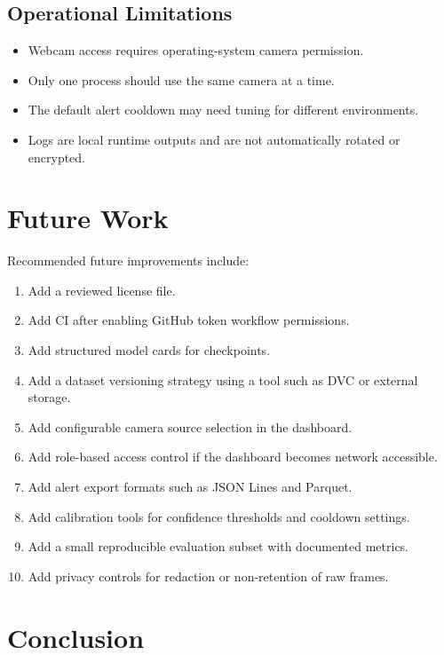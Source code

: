 \documentclass[12pt,a4paper]{report}
\begin{document}
\section{Operational Limitations}

\begin{itemize}
  \item Webcam access requires operating-system camera permission.
  \item Only one process should use the same camera at a time.
  \item The default alert cooldown may need tuning for different environments.
  \item Logs are local runtime outputs and are not automatically rotated or encrypted.
\end{itemize}

\chapter{Future Work}

Recommended future improvements include:

\begin{enumerate}
  \item Add a reviewed license file.
  \item Add CI after enabling GitHub token workflow permissions.
  \item Add structured model cards for checkpoints.
  \item Add a dataset versioning strategy using a tool such as DVC or external storage.
  \item Add configurable camera source selection in the dashboard.
  \item Add role-based access control if the dashboard becomes network accessible.
  \item Add alert export formats such as JSON Lines and Parquet.
  \item Add calibration tools for confidence thresholds and cooldown settings.
  \item Add a small reproducible evaluation subset with documented metrics.
  \item Add privacy controls for redaction or non-retention of raw frames.
\end{enumerate}

\chapter{Conclusion}
\end{document}
